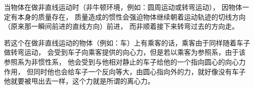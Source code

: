 当物体在做非直线运动时（非牛顿环境，例如：圆周运动或转弯运动），
因物体一定有本身的质量存在，
质量造成的惯性会强迫物体继续朝着运动轨迹的切线方向（原来那一瞬间前进的直线方向）前进，
而非顺着接下来转弯过去的方向走。
\par 若这个在做非直线运动的物体（例如：车）上有乘客的话，乘客由于同样随着车子做转弯运动，
会受到车子向乘客提供的向心力，但是若以乘客为参照系，由于该参照系为非惯性系，
他会受到与他相对静止的车子给他的一个指向圆心的向心力作用，
但同时他也会给车子一个反向等大，由圆心指向外的力，就好像没有车子他就要被甩出去一样，这个力就是所谓的离心力。
\clearpage
